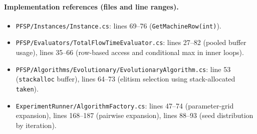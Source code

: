 \documentclass[12pt,a4paper]{report}
\begin{document}
\paragraph{Implementation references (files and line ranges).}
\begin{itemize}
    \item \texttt{PFSP/Instances/Instance.cs}: lines 69--76 (\texttt{GetMachineRow(int)}).
    \item \texttt{PFSP/Evaluators/TotalFlowTimeEvaluator.cs}: lines 27--82 (pooled buffer usage),
    lines 35--66 (row-based access and conditional max in inner loops).
    \item \texttt{PFSP/Algorithms/Evolutionary/EvolutionaryAlgorithm.cs}: line 53 (\texttt{stackalloc} buffer),
    lines 64--73 (elitism selection using stack-allocated \texttt{taken}).
    \item \texttt{ExperimentRunner/AlgorithmFactory.cs}: lines 47--74 (parameter-grid expansion),
    lines 168--187 (pairwise expansion), lines 88--93 (seed distribution by iteration).
\end{itemize}
\end{document}
